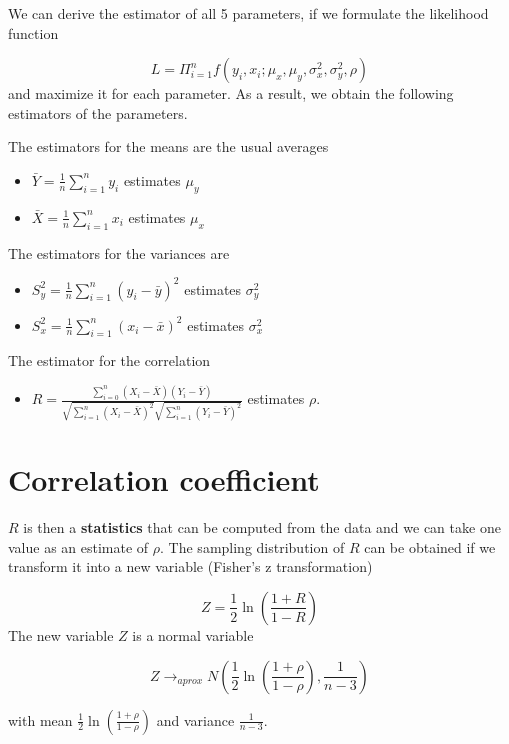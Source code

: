 \documentclass[
]{book}
\providecommand{\tightlist}{%
  \setlength{\itemsep}{0pt}\setlength{\parskip}{0pt}}
\begin{document}
We can derive the estimator of all 5 parameters, if we formulate the likelihood function

\[L=\Pi_{i=1}^n f(y_i,x_i; \mu_x, \mu_y, \sigma^2_x, \sigma_y^2, \rho)\]
and maximize it for each parameter. As a result, we obtain the following estimators of the parameters.

The estimators for the means are the usual averages

\begin{itemize}
\tightlist
\item
  \(\bar{Y}=\frac{1}{n}\sum_{i=1}^n y_i\) estimates \(\mu_y\)
\item
  \(\bar{X}=\frac{1}{n}\sum_{i=1}^n x_i\) estimates \(\mu_x\)
\end{itemize}

The estimators for the variances are

\begin{itemize}
\tightlist
\item
  \(S^2_y=\frac{1}{n}\sum_{i=1}^n (y_i-\bar{y})^2\) estimates \(\sigma^2_y\)
\item
  \(S^2_x=\frac{1}{n}\sum_{i=1}^n (x_i-\bar{x})^2\) estimates \(\sigma^2_x\)
\end{itemize}

The estimator for the correlation

\begin{itemize}
\tightlist
\item
  \(R=\frac{\sum_{i=0}^n(X_i-\bar{X})(Y_i-\bar{Y})}{\sqrt{\sum_{i=1}^n(X_i-\bar{X})^2}\sqrt{\sum_{i=1}^n(Y_i-\bar{Y})^2}}\) estimates \(\rho\).
\end{itemize}

\hypertarget{correlation-coefficient}{%
\section{Correlation coefficient}\label{correlation-coefficient}}

\(R\) is then a \textbf{statistics} that can be computed from the data and we can take one value as an estimate of \(\rho\). The sampling distribution of \(R\) can be obtained if we transform it into a new variable (Fisher's z transformation)

\[Z=\frac{1}{2}\ln (\frac{1+R}{1-R})\]
The new variable \(Z\) is a normal variable

\[Z \rightarrow_{aprox} N(\frac{1}{2}\ln (\frac{1+\rho}{1-\rho}), \frac{1}{n-3})\]

with mean \(\frac{1}{2}\ln (\frac{1+\rho}{1-\rho})\) and variance \(\frac{1}{n-3}\).
\end{document}
